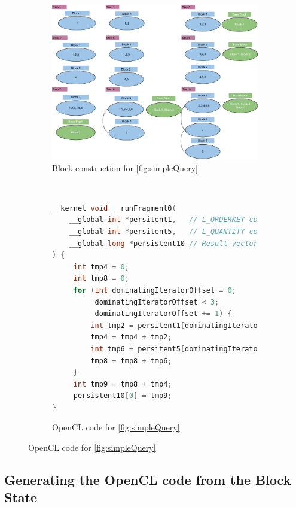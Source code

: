 \begin{figure}[p]
\centering

\begin{subfigure}{0.99\linewidth}
\includegraphics[width=\textwidth]{design-and-implementation/FragmentConstruction.pdf}
\centering
\caption{Block construction for \ref{fig:simpleQuery}}
\label{fig:fragConstruction}
\end{subfigure}
\\[5ex]
\begin{subfigure}{0.7\linewidth}
\begin{lstlisting}[frame=single, language=C]
__kernel void __runFragment0(
    __global int *persitent1,   // L_ORDERKEY column vector
    __global int *persitent5,   // L_QUANTITY column vector
    __global long *persistent10 // Result vector
) {
     int tmp4 = 0;
     int tmp8 = 0;
     for (int dominatingIteratorOffset = 0; 
          dominatingIteratorOffset < 3; 
          dominatingIteratorOffset += 1) {
         int tmp2 = persitent1[dominatingIteratorOffset];
         tmp4 = tmp4 + tmp2;
         int tmp6 = persitent5[dominatingIteratorOffset];
         tmp8 = tmp8 + tmp6;
     }
     int tmp9 = tmp8 + tmp4;
     persistent10[0] = tmp9;
}
\end{lstlisting}
    \caption{OpenCL code for \ref{fig:simpleQuery}}
    \label{fig:opencl-code}
\end{subfigure}

\end{figure}

\subsection{Generating the OpenCL code from the Block State}


